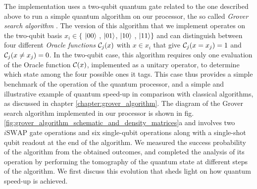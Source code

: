 The implementation uses a two-qubit quantum gate related to the one
described above to run a simple quantum algorithm on our processor,
the so called \textit{Grover search algorithm} \citep{Grover_Quantum_1997}.
The version of this algorithm that we implement operates on the
two-qubit basis $x_{i}\in\{$ $\left| 00 \right>$ , $\left| 01 \right>$, $\left| 10 \right>$
, $\left| 11 \right>\}$ and can distinguish between four different \textit{Oracle
functions} $\Or_{j}(x)$ with $x\in x_{i}$ that give $\Or_j(x=x_j)=1$ and $\Or_j(x \ne x_j)=0$. In the two-qubit case, this algorithm requires only
one evaluation of the Oracle function $\Or(x)$, implemented as a unitary operator,
to determine which state among the four possible ones it tags. This
case thus provides a simple benchmark of the operation of the quantum
processor, and a simple and illustrative example of quantum speed-up
in comparison with classical algorithms, as discussed
in chapter \ref{chapter:grover_algorithm}. The diagram of the Grover search algorithm implemented
in our processor is shown in fig. \ref{fig:grover_algorithm_schematic_and_density_matrices}a
and involves two $i\mathrm{SWAP}$ gate operations and six single-qubit
operations along with a single-shot qubit readout at the end of the
algorithm. We measured the success probability of the algorithm from
the obtained outcomes, and completed the analysis of its operation
by performing the tomography of the quantum state at different steps
of the algorithm. We first discuss this evolution that sheds light
on how quantum speed-up is achieved.

